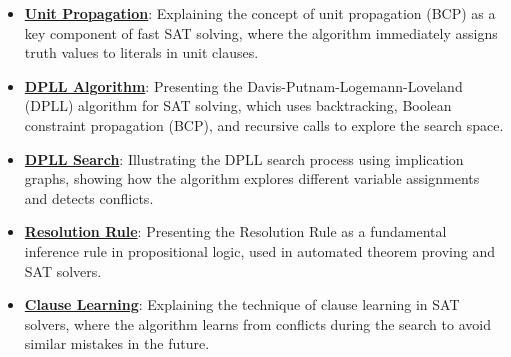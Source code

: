 \documentclass{article}%
\begin{document}
\begin{itemize}[leftmargin=*]
\item \href{https://purdue.brightspace.com/d2l/common/assets/pdfjs-d2l-dist/1.0.14-legacy/web/viewer.html?file=\%2Fcontent\%2Fenforced\%2F1095467-wl.202510.CS.24300.001\%2F15L2-SAT.pdf\%3Fou\%3D1095467\&lang=en-us\&container=d2l-fileviewer-rendered-pdf\&fullscreen=d2l-fileviewer-rendered-pdf-dialog\&height=667#page=20}{\textbf{Unit Propagation}}: Explaining the concept of unit propagation (BCP) as a key component of fast SAT solving, where the algorithm immediately assigns truth values to literals in unit clauses.%
\item \href{https://purdue.brightspace.com/d2l/common/assets/pdfjs-d2l-dist/1.0.14-legacy/web/viewer.html?file=\%2Fcontent\%2Fenforced\%2F1095467-wl.202510.CS.24300.001\%2F15L2-SAT.pdf\%3Fou\%3D1095467\&lang=en-us\&container=d2l-fileviewer-rendered-pdf\&fullscreen=d2l-fileviewer-rendered-pdf-dialog\&height=667#page=21}{\textbf{DPLL Algorithm}}: Presenting the Davis-Putnam-Logemann-Loveland (DPLL) algorithm for SAT solving, which uses backtracking, Boolean constraint propagation (BCP), and recursive calls to explore the search space.%
\item \href{https://purdue.brightspace.com/d2l/common/assets/pdfjs-d2l-dist/1.0.14-legacy/web/viewer.html?file=\%2Fcontent\%2Fenforced\%2F1095467-wl.202510.CS.24300.001\%2F15L2-SAT.pdf\%3Fou\%3D1095467\&lang=en-us\&container=d2l-fileviewer-rendered-pdf\&fullscreen=d2l-fileviewer-rendered-pdf-dialog\&height=667#page=22}{\textbf{DPLL Search}}: Illustrating the DPLL search process using implication graphs, showing how the algorithm explores different variable assignments and detects conflicts.%
\item \href{https://purdue.brightspace.com/d2l/common/assets/pdfjs-d2l-dist/1.0.14-legacy/web/viewer.html?file=\%2Fcontent\%2Fenforced\%2F1095467-wl.202510.CS.24300.001\%2F15L2-SAT.pdf\%3Fou\%3D1095467\&lang=en-us\&container=d2l-fileviewer-rendered-pdf\&fullscreen=d2l-fileviewer-rendered-pdf-dialog\&height=667#page=32}{\textbf{Resolution Rule}}: Presenting the Resolution Rule as a fundamental inference rule in propositional logic, used in automated theorem proving and SAT solvers.%
\item \href{https://purdue.brightspace.com/d2l/common/assets/pdfjs-d2l-dist/1.0.14-legacy/web/viewer.html?file=\%2Fcontent\%2Fenforced\%2F1095467-wl.202510.CS.24300.001\%2F15L2-SAT.pdf\%3Fou\%3D1095467\&lang=en-us\&container=d2l-fileviewer-rendered-pdf\&fullscreen=d2l-fileviewer-rendered-pdf-dialog\&height=667#page=34}{\textbf{Clause Learning}}: Explaining the technique of clause learning in SAT solvers, where the algorithm learns from conflicts during the search to avoid similar mistakes in the future.%

\end{itemize}
\end{document}
